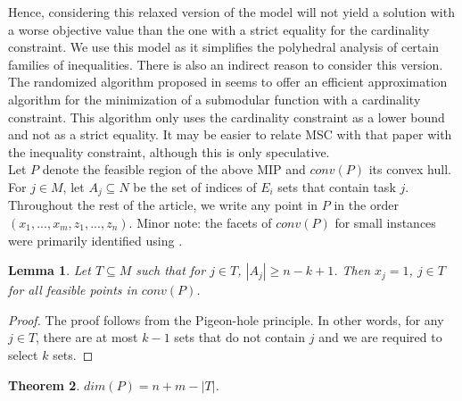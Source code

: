 \documentclass[12pt]{article}
\newtheorem{thm}{Theorem}
\newtheorem{lem}[thm]{Lemma}
\begin{document}
Hence, considering this relaxed version of the model will not yield a solution with a worse objective value than the one with a strict equality for the cardinality constraint. We use this model as it simplifies the polyhedral analysis of certain families of inequalities. There is also an indirect reason to consider this version. The randomized algorithm proposed in \cite{SvitkinaFleischer2011} seems to offer an efficient approximation algorithm for the minimization of a submodular function with a cardinality constraint. This algorithm only uses the cardinality constraint as a lower bound and not as a strict equality. It may be easier to relate MSC with that paper with the inequality constraint, although this is only speculative.\\

Let $P$ denote the feasible region of the above MIP and $conv(P)$ its convex hull. For $j \in M$, let $A_j \subseteq N$ be the set of indices of $E_i$ sets that contain task $j$. Throughout the rest of the article, we write any point in $P$ in the order $(x_1,...,x_m,z_1,...,z_n)$. Minor note: the facets of $conv(P)$ for small instances were primarily identified using \cite{polymake}.\\

\begin{lem} \label{lem:php}
Let $T \subseteq M$ such that for $j \in T$, $|A_j| \geq n-k+1$. Then $x_j=1$, $j \in T$ for all feasible points in $conv(P)$.
\end{lem}

\begin{proof}
The proof follows from the Pigeon-hole principle. In other words, for any $j \in T$, there are at most $k-1$ sets that do not contain $j$ and we are required to select $k$ sets.
\end{proof}

\begin{thm} \label{thm:dim}
$dim(P) = n + m - |T|$.
\end{thm}
\end{document}
